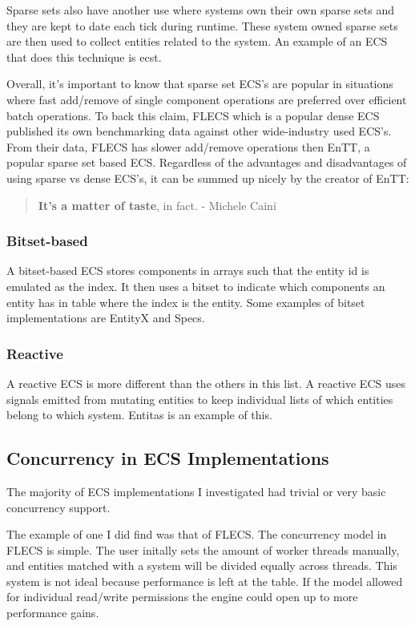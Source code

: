 Sparse sets also have another use where systems own their own sparse sets and they are kept to date each tick during runtime. These system owned sparse sets are then used to collect entities related to the system. An example of an ECS that does this technique is ecst. 

Overall, it's important to know that sparse set ECS's are popular in situations where fast add/remove of single component operations are preferred over efficient batch operations. To back this claim, FLECS which is a popular dense ECS published its own benchmarking data against other wide-industry used ECS's. From their data, FLECS has slower add/remove operations then EnTT, a popular sparse set based ECS. Regardless of the advantages and disadvantages of using sparse vs dense ECS's, it can be summed up nicely by the creator of EnTT:

\begin{quote}
    \textbf{It’s a matter of taste}, in fact.
        - Michele Caini
\end{quote}

\subsubsection{Bitset-based}
A bitset-based ECS stores components in arrays such that the entity id is emulated as the index. It then uses a bitset to indicate which components an entity has in table where the index is the entity. Some examples of bitset implementations are EntityX and Specs.

\subsubsection{Reactive}
A reactive ECS is more different than the others in this list. A reactive ECS uses signals emitted from mutating entities to keep individual lists of which entities belong to which system. Entitas is an example of this. 

\subsection{Concurrency in ECS Implementations}
The majority of ECS implementations I investigated had trivial or very basic concurrency support.

The example of one I did find was that of FLECS. The concurrency model in FLECS is simple. The user initally sets the amount of worker threads manually, and entities matched with a system will be divided equally across threads. 
This system is not ideal because performance is left at the table. If the model allowed for individual read/write permissions the engine could open up to more performance gains.
 
